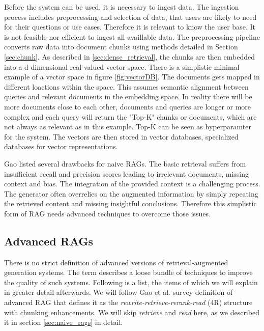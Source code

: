 Before the system can be used, it is necessary to ingest data. The ingestion process includes preprocessing and selection of data, that users are likely to need for their questions or use cases. Therefore it is relevant to know the user base. It is not feasible nor efficient to ingest all availlable data. The preprocessing pipeline converts raw data into document chunks using methods detailed in Section \ref{sec:chunk}. As described in \ref{sec:dense_retrieval}, the chunks are then embedded into a d-dimensional real-valued vector space. There is a simplistic minimal example of a vector space in figure \ref{fig:vectorDB}. The documents gets mapped in different loactions within the space. This assumes semantic alignment between queries and relevant documents in the embedding space. In reality there will be more documents close to each other, documents and queries are longer or more complex and each query will return the "Top-K" chunks or documents, which are not always as relevant as in this example. Top-K can be seen as hyperparamter for the system. The vectors are then stored in vector databases, specialized databases for vector representations.


Gao \cite{Gao.18.12.2023} listed several drawbacks for naive RAGs. The basic retrieval suffers from insufficient recall and precision scores leading to irrelevant documents, missing context and bias. The integration of the provided context is a challenging process. The generator often overrelies on the augmented information by simply repeating the retrieved content and missing insightful conclusions. Therefore this simplistic form of RAG needs advanced techniques to overcome those issues.

\subsection{Advanced RAGs}
\label{sec:advanced_rags}

There is no strict definition of advanced versions of retrieval-augmented generation systems. The term describes a loose bundle of techniques to improve the quality of such systems. Following is a list, the items of which we will explain in greater detail afterwards. We will follow Gao et al. survey definition of advanced RAG that defines it as the \textit{rewrite-retrieve-rerank-read} (4R) structure with chunking enhancements. We will skip \textit{retrieve} and \textit{read} here, as we described it in section \ref{sec:naive_rags} in detail.

